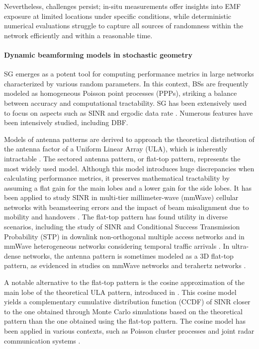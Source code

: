 Nevertheless, challenges persist; in-situ measurements offer insights into EMF exposure at limited locations under specific conditions, while deterministic numerical evaluations struggle to capture all sources of randomness within the network efficiently and within a reasonable time.

\paragraph{Dynamic beamforming models in stochastic geometry}

SG emerges as a potent tool for computing performance metrics in large networks characterized by various random parameters. In this context, BSs are frequently modeled as homogeneous Poisson point processes (PPPs), striking a balance between accuracy and computational tractability. SG has been extensively used to focus on aspects such as SINR and ergodic data rate \cite{Baccelli1997StochasticGA, Lee2013}. Numerous features have been intensively studied, including DBF.

Models of antenna patterns are derived to approach the theoretical distribution of the antenna factor of a Uniform Linear Array (ULA), which is inherently intractable \cite{Maamari16, yu2017}. The sectored antenna pattern, or flat-top pattern, represents the most widely used model. Although this model introduces huge discrepancies when calculating performance metrics, it preserves mathematical tractability by assuming a flat gain for the main lobes and a lower gain for the side lobes. It has been applied to study SINR in multi-tier millimeter-wave (mmWave) cellular networks with beamsteering errors \cite{direnzo15} and the impact of beam misalignment due to mobility and handovers \cite{Kalamkar22}. The flat-top pattern has found utility in diverse scenarios, including the study of SINR and Conditional Success Transmission Probability (STP) in downlink non-orthogonal multiple access networks \cite{chen21} and in mmWave heterogeneous networks considering temporal traffic arrivals \cite{Yang22}. In ultra-dense networks, the antenna pattern is sometimes modeled as a 3D flat-top pattern, as evidenced in studies on mmWave networks \cite{Kovalchukov19} and terahertz networks \cite{Wu21}.

A notable alternative to the flat-top pattern is the cosine approximation of the main lobe of the theoretical ULA pattern, introduced in \cite{yu2017}. This cosine model yields a complementary cumulative distribution function (CCDF) of SINR closer to the one obtained through Monte Carlo simulations based on the theoretical pattern than the one obtained using the flat-top pattern. The cosine model has been applied in various contexts, such as Poisson cluster processes \cite{Muhammad22} and joint radar communication systems \cite{Nabil23}.

